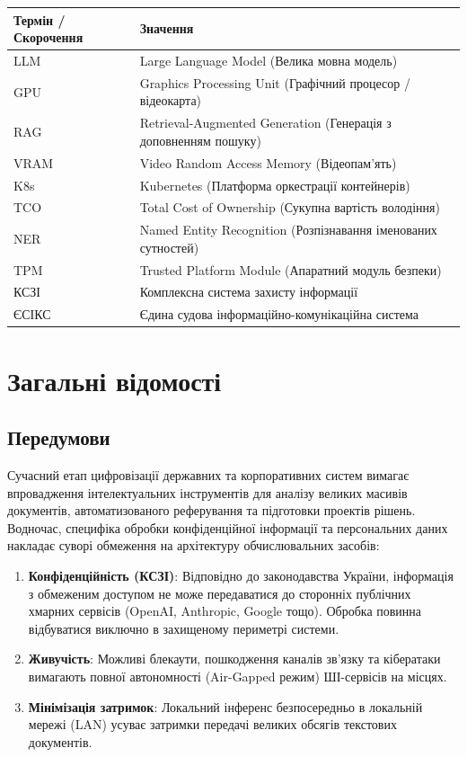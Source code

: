 \documentclass{article}
\begin{document}
\begin{longtable}{p{4cm}p{10cm}}
\toprule
\textbf{Термін / Скорочення} & \textbf{Значення} \\
\midrule
LLM & Large Language Model (Велика мовна модель) \\
GPU & Graphics Processing Unit (Графічний процесор / відеокарта) \\
RAG & Retrieval-Augmented Generation (Генерація з доповненням пошуку) \\
VRAM & Video Random Access Memory (Відеопам'ять) \\
K8s & Kubernetes (Платформа оркестрації контейнерів) \\
TCO & Total Cost of Ownership (Сукупна вартість володіння) \\
NER & Named Entity Recognition (Розпізнавання іменованих сутностей) \\
TPM & Trusted Platform Module (Апаратний модуль безпеки) \\
КСЗІ & Комплексна система захисту інформації \\
ЄСІКС & Єдина судова інформаційно-комунікаційна система \\
\bottomrule
\end{longtable}

\newpage
\section{Загальні відомості}

\subsection{Передумови}

Сучасний етап цифровізації державних та корпоративних систем вимагає впровадження інтелектуальних
інструментів для аналізу великих масивів документів, автоматизованого реферування та підготовки
проектів рішень. Водночас, специфіка обробки конфіденційної інформації та персональних даних накладає
суворі обмеження на архітектуру обчислювальних засобів:

\begin{enumerate}
\item \textbf{Конфіденційність (КСЗІ)}: Відповідно до законодавства України, інформація
      з обмеженим доступом не може передаватися до сторонніх публічних хмарних сервісів (OpenAI,
      Anthropic, Google тощо). Обробка повинна відбуватися виключно в захищеному периметрі системи.
\item \textbf{Живучість}: Можливі блекаути, пошкодження каналів зв'язку та кібератаки вимагають
      повної автономності (Air-Gapped режим) ШІ-сервісів на місцях.
\item \textbf{Мінімізація затримок}: Локальний інференс безпосередньо в локальній мережі (LAN) усуває
      затримки передачі великих обсягів текстових документів.
\end{enumerate}
\end{document}
